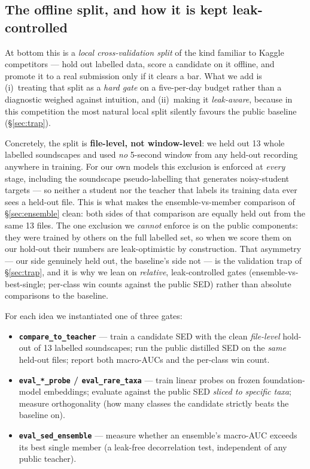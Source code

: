 \documentclass{ceurart}
\begin{document}
\subsection{The offline split, and how it is kept leak-controlled}
\label{sec:split}

At bottom this is a \emph{local cross-validation split} of the kind familiar to
Kaggle competitors --- hold out labelled data, score a candidate on it offline,
and promote it to a real submission only if it clears a bar. What we add is
(i)~treating that split as a \emph{hard gate} on a five-per-day budget rather than
a diagnostic weighed against intuition, and (ii)~making it \emph{leak-aware},
because in this competition the most natural local split silently favours the
public baseline (\S\ref{sec:trap}).

Concretely, the split is \textbf{file-level, not window-level}: we held out 13
whole labelled soundscapes and used \emph{no} 5-second window from any held-out
recording anywhere in training. For our own models this exclusion is enforced at
\emph{every} stage, including the soundscape pseudo-labelling that generates
noisy-student targets --- so neither a student nor the teacher that labels its
training data ever sees a held-out file. This is what makes the
ensemble-vs-member comparison of \S\ref{sec:ensemble} clean: both sides of that
comparison are equally held out from the same 13 files. The one exclusion we
\emph{cannot} enforce is on the public components: they were trained by others on
the full labelled set, so when we score them on our hold-out their numbers are
leak-optimistic by construction. That asymmetry --- our side genuinely held out,
the baseline's side not --- is the validation trap of \S\ref{sec:trap}, and it is
why we lean on \emph{relative}, leak-controlled gates (ensemble-vs-best-single;
per-class win counts against the public SED) rather than absolute comparisons to
the baseline.

For each idea we instantiated one of three gates:

\begin{itemize}
  \item \textbf{\texttt{compare\_to\_teacher}} --- train a candidate SED with the
        clean \emph{file-level} hold-out of 13 labelled soundscapes; run the public
        distilled SED on the \emph{same} held-out files; report both macro-AUCs and
        the per-class win count.
  \item \textbf{\texttt{eval\_*\_probe} / \texttt{eval\_rare\_taxa}} --- train
        linear probes on frozen foundation-model embeddings; evaluate against the
        public SED \emph{sliced to specific taxa}; measure orthogonality (how many
        classes the candidate strictly beats the baseline on).
  \item \textbf{\texttt{eval\_sed\_ensemble}} --- measure whether an ensemble's
        macro-AUC exceeds its best single member (a leak-free decorrelation test,
        independent of any public teacher).
\end{itemize}
\end{document}
